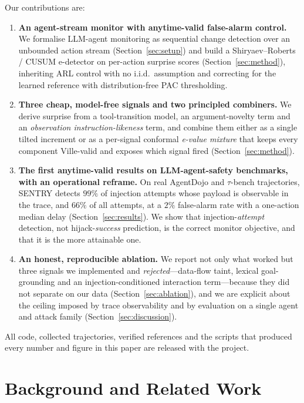 \documentclass[10pt,journal,compsoc]{IEEEtran}
\theoremstyle{plain}
\theoremstyle{definition}
\begin{document}
Our contributions are:
\begin{enumerate}
\item \textbf{An agent-stream monitor with anytime-valid false-alarm
control.} We formalise LLM-agent monitoring as sequential change detection
over an unbounded action stream (Section~\ref{sec:setup}) and build a
Shiryaev--Roberts / CUSUM e-detector on per-action surprise scores
(Section~\ref{sec:method}), inheriting ARL control with no i.i.d.\ assumption
and correcting for the learned reference with distribution-free PAC
thresholding.

\item \textbf{Three cheap, model-free signals and two principled combiners.}
We derive surprise from a tool-transition model, an argument-novelty term and
an \emph{observation instruction-likeness} term, and combine them either as a
single tilted increment or as a per-signal conformal \emph{e-value mixture}
that keeps every component Ville-valid and exposes which signal fired
(Section~\ref{sec:method}).

\item \textbf{The first anytime-valid results on LLM-agent-safety
benchmarks, with an operational reframe.} On real AgentDojo and
\(\tau\)-bench trajectories, SENTRY detects \(99\%\) of injection attempts
whose payload is observable in the trace, and \(66\%\) of all attempts, at a
\(2\%\) false-alarm rate with a one-action median delay
(Section~\ref{sec:results}). We show that injection-\emph{attempt} detection,
not hijack-\emph{success} prediction, is the correct monitor objective, and
that it is the more attainable one.

\item \textbf{An honest, reproducible ablation.} We report not only what
worked but three signals we implemented and \emph{rejected}---data-flow taint,
lexical goal-grounding and an injection-conditioned interaction term---because
they did not separate on our data (Section~\ref{sec:ablation}), and we are
explicit about the ceiling imposed by trace observability and by evaluation on
a single agent and attack family (Section~\ref{sec:discussion}).
\end{enumerate}

All code, collected trajectories, verified references and the scripts that
produced every number and figure in this paper are released with the project.

\section{Background and Related Work}\label{sec:related}
\end{document}
